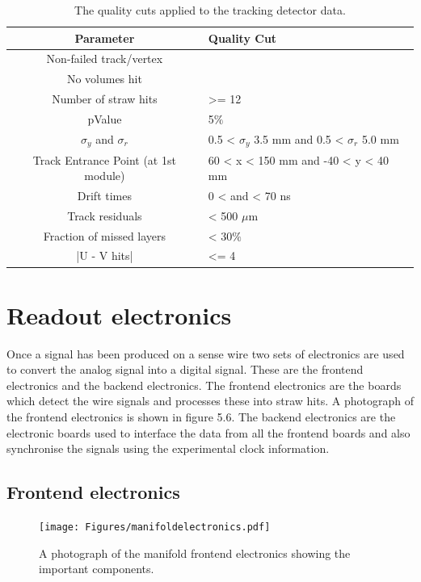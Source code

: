 \begin{table}[h!]
\begin{center}
 \begin{tabular}{||c | m{5cm}||} 
 \hline
 Parameter & Quality Cut \\ [0.5ex] 
 \hline\hline
 Non-failed track/vertex &  \\ 
 \hline
 No volumes hit & \\
 \hline
 Number of straw hits  & >= 12 \\ 
 \hline
 pValue & 5$\%$ \\ 
 \hline
 $\sigma_{y}$ and $\sigma_{r}$ & 0.5 < $\sigma_{y}$ 3.5 mm and 0.5 < $\sigma_{r}$ 5.0 mm\\
 \hline
 Track Entrance Point (at 1st module) & 60 < x < 150 mm and -40 < y < 40 mm \\
 \hline
Drift times & 0 < and < 70 ns \\ 
 \hline
 Track residuals & < 500 $\mu$m \\
 \hline
 Fraction of missed layers & < 30$\%$ \\ 
 \hline
 |U - V hits| & <= 4 \\ [1ex] 
 \hline
\end{tabular}
\caption{The quality cuts applied to the tracking detector data.}
\label{table:2}
\end{center}
\end{table}

\section{Readout electronics}

Once a signal has been produced on a sense wire two sets of electronics are used to convert the analog signal into a digital signal. These are the frontend electronics and the backend electronics. The frontend electronics are the boards which detect the wire signals and processes these into straw hits. A photograph of the frontend electronics is shown in figure 5.6. The backend electronics are the electronic boards used to interface the data from all the frontend boards and also synchronise the signals using the experimental clock information.

\subsection{Frontend electronics}

\begin{figure}[th]
\centering
\texttt{[image: Figures/manifoldelectronics.pdf]}
\decoRule
\caption{A photograph of the manifold frontend electronics showing the important components.}
\label{fig:manifoldelectronics}
\end{figure}

